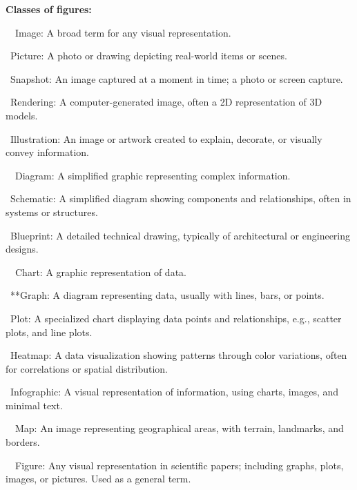 \documentclass[a4paper, 12pt]{article}
\begin{document}
\newpage\textbf{Classes of figures:}
\par\ \textbullet\ Image: A broad term for any visual representation.
\par\quad\textopenbullet\ Picture: A photo or drawing depicting real-world items or scenes.
\par\quad\textopenbullet\ Snapshot: An image captured at a moment in time; a photo or screen capture.
\par\quad\textopenbullet\ Rendering: A computer-generated image, often a 2D representation of 3D models.
\par\quad\textopenbullet\ Illustration: An image or artwork created to explain, decorate, or visually convey information.
\par\ \textbullet\ Diagram: A simplified graphic representing complex information.
\par\quad\textopenbullet\ Schematic: A simplified diagram showing components and relationships, often in systems or structures.
\par\quad\textopenbullet\ Blueprint: A detailed technical drawing, typically of architectural or engineering designs.
\par\ \textbullet\ Chart: A graphic representation of data.
\par\quad\textopenbullet\ **Graph: A diagram representing data, usually with lines, bars, or points.
\par\quad\textopenbullet\ Plot: A specialized chart displaying data points and relationships, e.g., scatter plots, and line plots.
\par\quad\textopenbullet\ Heatmap: A data visualization showing patterns through color variations, often for correlations or spatial distribution.
\par\quad\textopenbullet\ Infographic: A visual representation of information, using charts, images, and minimal text.
\par\ \textbullet\ Map: An image representing geographical areas, with terrain, landmarks, and borders.
\par\ \textbullet\ Figure: Any visual representation in scientific papers; including graphs, plots, images, or pictures. Used as a general term.
\end{document}
